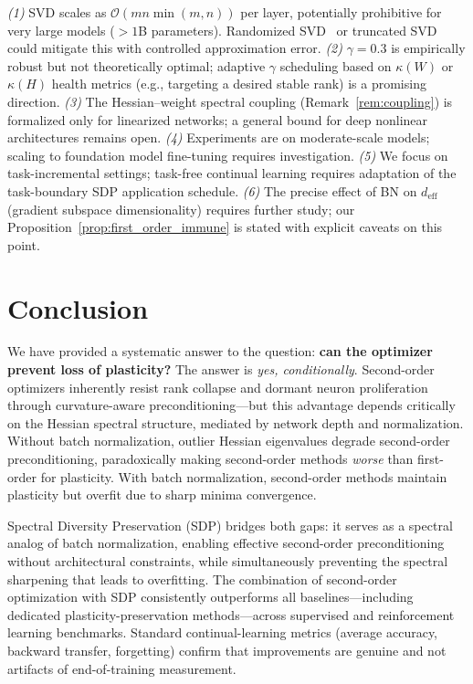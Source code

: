\documentclass{article}
\newcommand{\cO}{\mathcal{O}}
\begin{document}
\emph{(1)} SVD scales as $\cO(mn\min(m,n))$ per layer, potentially prohibitive for very large models ($>1$B parameters). Randomized SVD~\citep{halko2011finding} or truncated SVD could mitigate this with controlled approximation error.
\emph{(2)} $\gamma = 0.3$ is empirically robust but not theoretically optimal; adaptive $\gamma$ scheduling based on $\kappa(W)$ or $\kappa(H)$ health metrics (e.g., targeting a desired stable rank) is a promising direction.
\emph{(3)} The Hessian--weight spectral coupling (Remark~\ref{rem:coupling}) is formalized only for linearized networks; a general bound for deep nonlinear architectures remains open.
\emph{(4)} Experiments are on moderate-scale models; scaling to foundation model fine-tuning requires investigation.
\emph{(5)} We focus on task-incremental settings; task-free continual learning requires adaptation of the task-boundary SDP application schedule.
\emph{(6)} The precise effect of BN on $d_\mathrm{eff}$ (gradient subspace dimensionality) requires further study; our Proposition~\ref{prop:first_order_immune} is stated with explicit caveats on this point.

\section{Conclusion}
\label{sec:conclusion}

We have provided a systematic answer to the question: \textbf{can the optimizer prevent loss of plasticity?} The answer is \emph{yes, conditionally}. Second-order optimizers inherently resist rank collapse and dormant neuron proliferation through curvature-aware preconditioning---but this advantage depends critically on the Hessian spectral structure, mediated by network depth and normalization. Without batch normalization, outlier Hessian eigenvalues degrade second-order preconditioning, paradoxically making second-order methods \emph{worse} than first-order for plasticity. With batch normalization, second-order methods maintain plasticity but overfit due to sharp minima convergence.

Spectral Diversity Preservation (SDP) bridges both gaps: it serves as a spectral analog of batch normalization, enabling effective second-order preconditioning without architectural constraints, while simultaneously preventing the spectral sharpening that leads to overfitting. The combination of second-order optimization with SDP consistently outperforms all baselines---including dedicated plasticity-preservation methods---across supervised and reinforcement learning benchmarks. Standard continual-learning metrics (average accuracy, backward transfer, forgetting) confirm that improvements are genuine and not artifacts of end-of-training measurement.
\end{document}
